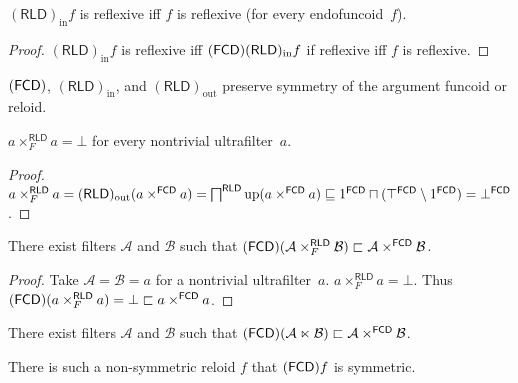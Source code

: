 \begin{prop}
  $(\mathsf{RLD})_{\operatorname{in}} f$ is reflexive iff $f$ is reflexive (for
  every endofuncoid~$f$).
\end{prop}

\begin{proof}
  $(\mathsf{RLD})_{\operatorname{in}} f$ is reflexive iff
  $(\mathsf{FCD}) (\mathsf{RLD})_{\operatorname{in}} f$ if reflexive iff
  $f$ is reflexive.
\end{proof}

\begin{obvious}
$(\mathsf{FCD})$, $(\mathsf{RLD})_{\operatorname{in}}$, and
$(\mathsf{RLD})_{\operatorname{out}}$ preserve symmetry of the argument funcoid
or reloid.\end{obvious}

\begin{prop}
  $a \times^{\mathsf{RLD}}_F a = \bot$ for every nontrivial ultrafilter~$a$.
\end{prop}

\begin{proof}
  $a \times^{\mathsf{RLD}}_F a = (\mathsf{RLD})_{\operatorname{out}} (a
  \times^{\mathsf{FCD}} a) = \bigsqcap^{\mathsf{RLD}} \operatorname{up}
  (a \times^{\mathsf{FCD}} a) \sqsubseteq 1^{\mathsf{FCD}}
  \sqcap (\top^{\mathsf{FCD}} \setminus 1^{\mathsf{FCD}}) =
  \bot^{\mathsf{FCD}}$.
\end{proof}

\begin{example}
  There exist filters $\mathcal{A}$ and $\mathcal{B}$ such that
  $(\mathsf{FCD}) (\mathcal{A} \times^{\mathsf{RLD}}_F
  \mathcal{B}) \sqsubset \mathcal{A} \times^{\mathsf{FCD}}
  \mathcal{B}$.
\end{example}

\begin{proof}
  Take $\mathcal{A} = \mathcal{B} = a$ for a nontrivial ultrafilter~$a$. $a
  \times^{\mathsf{RLD}}_F a = \bot$. Thus $(\mathsf{FCD}) (a
  \times^{\mathsf{RLD}}_F a) = \bot \sqsubset a
  \times^{\mathsf{FCD}} a$.
\end{proof}

\begin{conjecture}
  There exist filters $\mathcal{A}$ and $\mathcal{B}$ such that
  $(\mathsf{FCD}) (\mathcal{A} \ltimes \mathcal{B}) \sqsubset
  \mathcal{A} \times^{\mathsf{FCD}} \mathcal{B}$.
\end{conjecture}

\begin{conjecture}
  There is such a non-symmetric reloid $f$ that $(\mathsf{FCD}) f$ is
  symmetric.
\end{conjecture}

